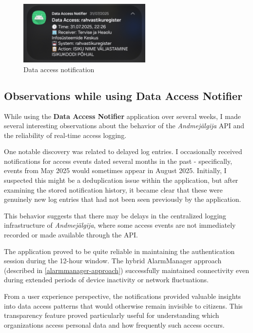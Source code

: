 \begin{figure}[H]
\centering
\includegraphics[width=250px]{english/figures/Screenshot_20250801_133754_Signal.jpg}
\caption{Data access notification}
\label{fig:data-access-notification}
\end{figure}

\subsection{Observations while using \textbf{Data Access Notifier}}
\label{observations}

While using the \textbf{Data Access Notifier} application over several weeks, I made several interesting observations about the behavior of the \textit{Andmejälgija} API and the reliability of real-time access logging.

One notable discovery was related to delayed log entries. I occasionally received notifications for access events dated several months in the past - specifically, events from May 2025 would sometimes appear in August 2025. Initially, I suspected this might be a deduplication issue within the application, but after examining the stored notification history, it became clear that these were genuinely new log entries that had not been seen previously by the application.

This behavior suggests that there may be delays in the centralized logging infrastructure of \textit{Andmejälgija}, where some access events are not immediately recorded or made available through the API.

The application proved to be quite reliable in maintaining the authentication session during the 12-hour window. The hybrid AlarmManager approach (described in \ref{alarmmanager-approach}) successfully maintained connectivity even during extended periods of device inactivity or network fluctuations.

From a user experience perspective, the notifications provided valuable insights into data access patterns that would otherwise remain invisible to citizens. This transparency feature proved particularly useful for understanding which organizations access personal data and how frequently such access occurs.

